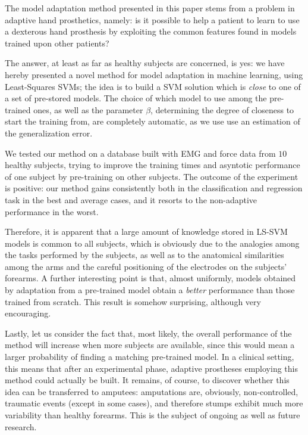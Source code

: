 The model adaptation method presented in this paper stems from a
problem in adaptive hand prosthetics, namely: is it possible to help a
patient to learn to use a dexterous hand prosthesis 
by exploiting the common features found in models trained upon other
patients?

The answer, at least as far as healthy subjects are concerned, is yes:
we have hereby presented a novel method for model adaptation in
machine learning, using Least-Squares SVMs; the idea is to build a SVM
solution which is \emph{close} to one of a set of pre-stored
models. The choice of which model to use among the pre-trained ones,
as well as the parameter $\beta$, determining the degree of closeness
to start the training from, are completely automatic, as we use use an
estimation of the generalization error.

We tested our method on a database built with EMG and force data from
$10$ healthy subjects, trying to improve the training times and
asyntotic performance of one subject by pre-training on other
subjects. The outcome of the experiment is positive: our method gains
consistently both in the classification and regression task in the
best and average cases, and it resorts to the non-adaptive performance
in the worst.

Therefore, it is apparent that a large amount of knowledge stored in
LS-SVM models is common to all subjects, which is obviously due to the
analogies among the tasks performed by the subjects, as well as to the
anatomical similarities among the arms and the careful positioning of
the electrodes on the subjects' forearms. A further interesting point
is that, almost uniformly, models obtained by adaptation from a
pre-trained model obtain a \emph{better} performance than those
trained from scratch. This result is somehow surprising, although very
encouraging.

Lastly, let us consider the fact that, most likely, the overall
performance of the method will increase when more subjects are
available, since this would mean a larger probability of finding a
matching pre-trained model. In a clinical setting, this means that
after an experimental phase, adaptive prostheses employing this method
could actually be built. It remains, of course, to discover whether
this idea can be transferred to amputees: amputations are, obviously,
non-controlled, traumatic events (except in some cases), and therefore
stumps exhibit much more variability than healthy forearms. This is
the subject of ongoing as well as future research.
